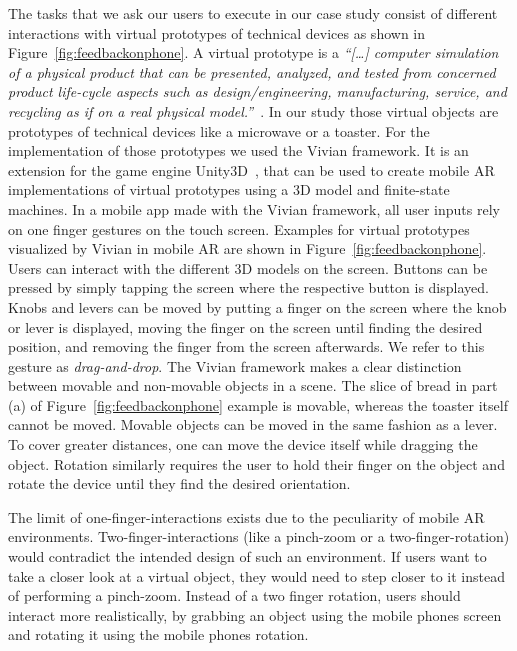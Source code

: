 \documentclass[manuscript]{acmart}
\begin{document}
		The tasks that we ask our users to execute in our case study consist of different interactions with virtual prototypes of technical devices as shown in Figure~\ref{fig:feedbackonphone}. A virtual prototype is a \textit{``\textnormal{[…]} computer simulation of a physical product that can be presented, analyzed, and tested from concerned product life-cycle aspects such as design/engineering, manufacturing, service, and recycling as if on a real physical model.''}~\cite{Wang2002}. In our study those virtual objects are prototypes of technical devices like a microwave or a toaster. For the implementation of those prototypes we used the Vivian framework. It is an extension for the game engine Unity3D~\cite{Unity}, that can be used to create mobile \ac{AR} implementations of virtual prototypes using a 3D model and finite-state machines. In a mobile app made with the Vivian framework, all user inputs rely on one finger gestures on the touch screen. Examples for virtual prototypes visualized by Vivian in mobile AR are shown in Figure~\ref{fig:feedbackonphone}. Users can interact with the different 3D models on the screen. Buttons can be pressed by simply tapping the screen where the respective button is displayed. Knobs and levers can be moved by putting a finger on the screen where the knob or lever is displayed, moving the finger on the screen until finding the desired position, and removing the finger from the screen afterwards. We refer to this gesture as \emph{drag-and-drop}. The Vivian framework makes a clear distinction between movable and non-movable objects in a scene. The slice of bread in part (a) of Figure~\ref{fig:feedbackonphone} example is movable, whereas the toaster itself cannot be moved. Movable objects can be moved in the same fashion as a lever. To cover greater distances, one can move the device itself while dragging the object. Rotation similarly requires the user to hold their finger on the object and rotate the device until they find the desired orientation.

		The limit of one-finger-interactions exists due to the peculiarity of mobile \ac{AR} environments. Two-finger-interactions (like a pinch-zoom or a two-finger-rotation) would contradict the intended design of such an environment. If users want to take a closer look at a virtual object, they would need to step closer to it instead of performing a pinch-zoom. Instead of a two finger rotation, users should interact more realistically, by grabbing an object using the mobile phones screen and rotating it using the mobile phones rotation.
\end{document}
